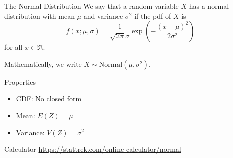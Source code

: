 \begin{frame}
  
  \begin{block}{The Normal Distribution}
    We say that a random variable $X$ has a normal distribution with mean $\mu$ and variance $\sigma^2$ if the pdf of $X$ is
    \[
      f(x;\mu,\sigma)=\frac{1}{\sqrt{2\pi}\sigma} \exp\left(-\frac{(x-\mu)^2}{2\sigma^2}\right)
    \]
    for all $x \in \Re$. 
    
    \bigskip
    
    Mathematically, we write $ X \sim \mbox{Normal}(\mu,\sigma^2)$.
  \end{block}
\end{frame}

\begin{frame}
  \begin{block}{Properties}
        \begin{itemize}
        \item CDF: No closed form


        \item Mean: $E(Z)=\mu$
      
        \item Variance: $V(Z)=\sigma^2$

        \end{itemize}
  \end{block}
  
  \begin{block}{Calculator}
  \url{https://stattrek.com/online-calculator/normal}
  \end{block}
\end{frame}

